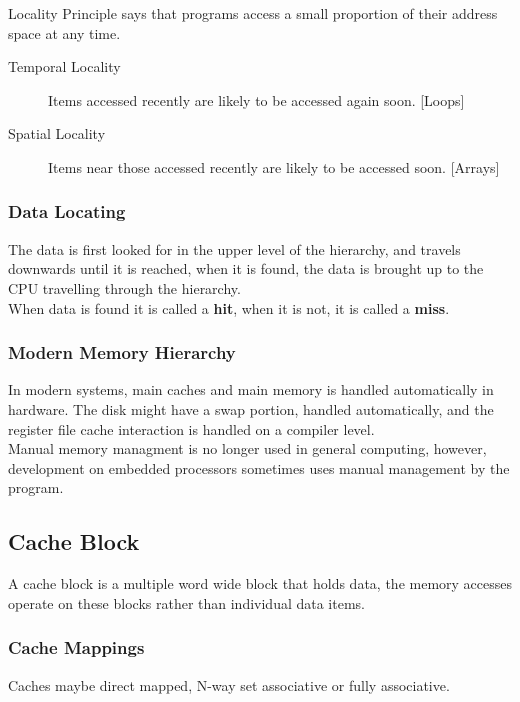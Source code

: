 \documentclass[11pt,a4paper,twocolumn]{book}
\begin{document}
Locality Principle says that programs access a small proportion of their address space at any time.

\begin{description}
\item[Temporal Locality] Items accessed recently are likely to be accessed again soon. [Loops]
\item[Spatial Locality] Items near those accessed recently are likely to be accessed soon. [Arrays]
\end{description}

\subsubsection{Data Locating}

The data is first looked for in the upper level of the hierarchy, and travels downwards until it is reached, when it is found, the data is brought up to the CPU travelling through the hierarchy.\\

When data is found it is called a \textbf{hit}, when it is not, it is called a \textbf{miss}.

\subsubsection{Modern Memory Hierarchy}

In modern systems, main caches and main memory is handled automatically in hardware. The disk might have a swap portion, handled automatically, and the register file cache interaction is handled on a compiler level.\\

Manual memory managment is no longer used in general computing, however, development on embedded processors sometimes uses manual management by the program.\\

\subsection{Cache Block}

A cache block is a multiple word wide block that  holds data, the memory accesses operate on these blocks rather than individual data items.

\subsubsection{Cache Mappings}

Caches maybe direct mapped, N-way set associative or fully associative.
\end{document}
